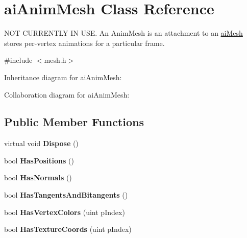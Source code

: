 \hypertarget{structai_anim_mesh}{\section{ai\+Anim\+Mesh Class Reference}
\label{structai_anim_mesh}
}


N\+O\+T C\+U\+R\+R\+E\+N\+T\+L\+Y I\+N U\+S\+E. An Anim\+Mesh is an attachment to an \hyperlink{structai_mesh}{ai\+Mesh} stores per-\/vertex animations for a particular frame.  




{\ttfamily \#include $<$mesh.\+h$>$}



Inheritance diagram for ai\+Anim\+Mesh\+:


Collaboration diagram for ai\+Anim\+Mesh\+:
\subsection*{Public Member Functions}
\begin{DoxyCompactItemize}
\item 
\hypertarget{structai_anim_mesh_ad8373d960be5d978ad3ef37db89eea08}{virtual void {\bfseries Dispose} ()}\label{structai_anim_mesh_ad8373d960be5d978ad3ef37db89eea08}

\item 
\hypertarget{structai_anim_mesh_a07b09e76adaebd12ca2f6b4158607a64}{bool {\bfseries Has\+Positions} ()}\label{structai_anim_mesh_a07b09e76adaebd12ca2f6b4158607a64}

\item 
\hypertarget{structai_anim_mesh_ace52e39c716952bdd535e94ca0cde814}{bool {\bfseries Has\+Normals} ()}\label{structai_anim_mesh_ace52e39c716952bdd535e94ca0cde814}

\item 
\hypertarget{structai_anim_mesh_a202384efeb2d719e0c4a05157ae1910b}{bool {\bfseries Has\+Tangents\+And\+Bitangents} ()}\label{structai_anim_mesh_a202384efeb2d719e0c4a05157ae1910b}

\item 
\hypertarget{structai_anim_mesh_ad1118d45a1ccc802fd43925e2d8edcce}{bool {\bfseries Has\+Vertex\+Colors} (uint p\+Index)}\label{structai_anim_mesh_ad1118d45a1ccc802fd43925e2d8edcce}

\item 
\hypertarget{structai_anim_mesh_ae69216ab82470d3f3947340c04bd57cb}{bool {\bfseries Has\+Texture\+Coords} (uint p\+Index)}\label{structai_anim_mesh_ae69216ab82470d3f3947340c04bd57cb}

\end{DoxyCompactItemize}
